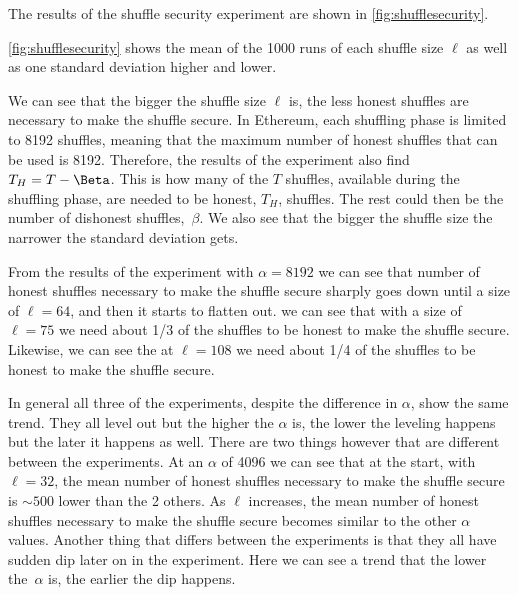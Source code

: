 The results of the shuffle security experiment are shown in \autoref{fig:shufflesecurity}.

\autoref{fig:shufflesecurity} shows the mean of the 1000 runs of each shuffle size $\ell$ as well as one standard deviation higher and lower.

We can see that the bigger the shuffle size $\ell$ is, the less honest shuffles are necessary to make the shuffle secure.
In Ethereum, each shuffling phase is limited to 8192 shuffles, meaning that the maximum number of honest shuffles that can be used is 8192.
Therefore, the results of the experiment also find $T_H=T-\Beta$.
This is how many of the $T$ shuffles, available during the shuffling phase, are needed to be honest, $T_H$, shuffles.
The rest could then be the number of dishonest shuffles,~$\beta$.
We also see that the bigger the shuffle size the narrower the standard deviation gets.

From the results of the experiment with $\alpha=8192$ we can see that number of honest shuffles necessary to make the shuffle secure sharply goes down until a size of $\ell=64$, and then it starts to flatten out.
we can see that with a size of $\ell=75$ we need about 1/3 of the shuffles to be honest to make the shuffle secure.
Likewise, we can see the at $\ell=108$ we need about 1/4 of the shuffles to be honest to make the shuffle secure.

In general all three of the experiments, despite the difference in $\alpha$, show the same trend.
They all level out but the higher the $\alpha$ is, the lower the leveling happens but the later it happens as well.
There are two things however that are different between the experiments.
At an $\alpha$ of 4096 we can see that at the start, with $\ell=32$, the mean number of honest shuffles necessary to make the shuffle secure is $\sim500$ lower than the 2 others.
As $\ell$ increases, the mean number of honest shuffles necessary to make the shuffle secure becomes similar to the other $\alpha$ values.
Another thing that differs between the experiments is that they all have sudden dip later on in the experiment.
Here we can see a trend that the lower the~$\alpha$ is, the earlier the dip happens.

